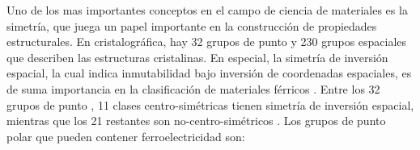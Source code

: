 \newpage
{}\label{anexoC}
Uno de los mas importantes conceptos en el campo de ciencia de materiales es la simetría, que juega un papel importante en la construcción de propiedades estructurales. En cristalográfica, hay 32 grupos de punto y 230 grupos espaciales que describen las estructuras cristalinas. En especial, la simetría de inversión espacial, la cual indica inmutabilidad bajo inversión de coordenadas espaciales, es de suma importancia en la clasificación de materiales férricos . Entre los 32 grupos de punto , 11 clases centro-simétricas tienen simetría de inversión espacial, mientras que los 21 restantes son no-centro-simétricos \cite{Shi2016SymmetryFerroelectrics}. Los grupos de punto polar que pueden contener ferroelectricidad son: 


